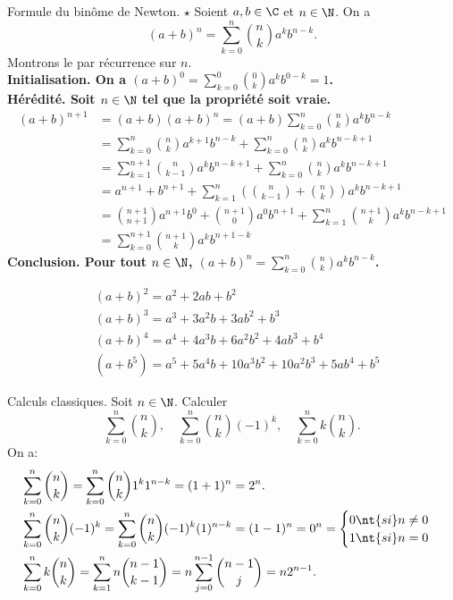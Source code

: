\documentclass[11pt]{article}
\begin{document}
\begin{thm}{Formule du binôme de Newton. $\star$}{}
    Soient $a,b\in\C$ et $n\in\N$. On a
    \begin{equation*}
        (a+b)^n=\sum_{k=0}^n\binom{n}{k}a^kb^{n-k}.
    \end{equation*}
    \tcblower
    Montrons le par récurrence sur $n$.\\
    \bf{Initialisation.} On a $(a+b)^0=\sum_{k=0}^0\binom{0}{k}a^kb^{0-k}=1$.\\
    \bf{Hérédité.} Soit $n\in\N$ tel que la propriété soit vraie.
    \begin{align*}
        (a+b)^{n+1}&=(a+b)(a+b)^n=(a+b)\sum_{k=0}^n\binom{n}{k}a^kb^{n-k}\\
        &=\sum_{k=0}^n\binom{n}{k}a^{k+1}b^{n-k}+\sum_{k=0}^n\binom{n}{k}a^kb^{n-k+1}\\
        &=\sum_{k=1}^{n+1}\binom{n}{k-1}a^kb^{n-k+1}+\sum_{k=0}^n\binom{n}{k}a^kb^{n-k+1}\\
        &=a^{n+1}+b^{n+1}+\sum_{k=1}^n\left( \binom{n}{k-1}+\binom{n}{k} \right)a^kb^{n-k+1}\\
        &=\binom{n+1}{n+1}a^{n+1}b^0+\binom{n+1}{0}a^0b^{n+1}+\sum_{k=1}^n\binom{n+1}{k}a^kb^{n-k+1}\\
        &=\sum_{k=0}^{n+1}\binom{n+1}{k}a^kb^{n+1-k}
    \end{align*}
    \bf{Conclusion.} Pour tout $n\in\N$, $(a+b)^n=\sum_{k=0}^n\binom{n}{k}a^kb^{n-k}$.
\end{thm}

\begin{ex}{}{}
    \begin{align*}
        &(a+b)^2=a^2+2ab+b^2\\
        &(a+b)^3=a^3+3a^2b+3ab^2+b^3\\
        &(a+b)^4=a^4+4a^3b+6a^2b^2+4ab^3+b^4\\
        &(a+b^5)=a^5+5a^4b+10a^3b^2+10a^2b^3+5ab^4+b^5
    \end{align*}
\end{ex}

\begin{ex}{Calculs classiques.}{}
    Soit $n\in\N$. Calculer
    \begin{equation*}
        \sum_{k=0}^n\binom{n}{k}, \quad \sum_{k=0}^n\binom{n}{k}(-1)^k,\quad\sum_{k=0}^nk\binom{n}{k}.
    \end{equation*}
    \tcblower
    On a:
    \begin{align*}
        &\sum_{k=0}^n\binom{n}{k}=\sum_{k=0}^n\binom{n}{k}1^k1^{n-k}=(1+1)^n=2^n.\\
        &\sum_{k=0}^n\binom{n}{k}(-1)^k=\sum_{k=0}^n\binom{n}{k}(-1)^k(1)^{n-k}=(1-1)^n=0^n=\begin{cases}
            0 \nt{ si }n\neq0\\
            1 \nt{ si }n=0
        \end{cases}\\
        &\sum_{k=0}^nk\binom{n}{k}=\sum_{k=1}^nn\binom{n-1}{k-1}=n\sum_{j=0}^{n-1}\binom{n-1}{j}=n2^{n-1}.
    \end{align*}
\end{ex}
\end{document}
